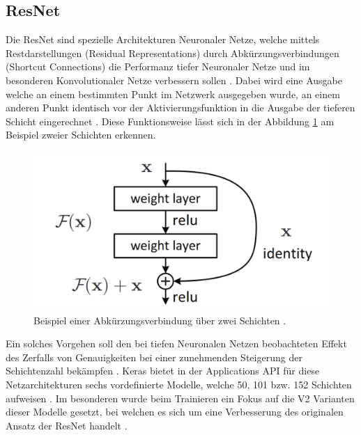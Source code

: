 \documentclass[twoside,a4paper]{IEEEtran}
\begin{document}
\subsection{ResNet} %
Die ResNet sind spezielle Architekturen Neuronaler Netze, welche mittels Restdarstellungen (Residual Representations) durch Abkürzungsverbindungen (Shortcut Connections) die Performanz tiefer Neuronaler Netze und im besonderen Konvolutionaler Netze verbessern sollen \cite[S.1-2]{resnet}. Dabei wird eine Ausgabe welche an einem bestimmten Punkt im Netzwerk ausgegeben wurde, an einem anderen Punkt identisch vor der Aktivierungsfunktion in die Ausgabe der tieferen Schicht eingerechnet \cite[S.4]{resnet}. Diese Funktionsweise lässt sich in der Abbildung \ref{res} am Beispiel zweier Schichten erkennen.
\begin{figure}[!htb]
	\includegraphics[width=\columnwidth]{residual}
	\caption{Beispiel einer Abkürzungsverbindung über zwei Schichten \cite[S.2]{resnet}.}
	\label{res}
\end{figure}


Ein solches Vorgehen soll den bei tiefen Neuronalen Netzen beobachteten Effekt des Zerfalls von Genauigkeiten bei einer zunehmenden Steigerung der Schichtenzahl bekämpfen \cite[S.1]{resnet}. Keras bietet in der Applications API für diese Netzarchitekturen sechs vordefinierte Modelle, welche 50, 101 bzw. 152 Schichten aufweisen \cite{resnet_keras}. Im besonderen wurde beim Trainieren ein Fokus auf die V2 Varianten dieser Modelle gesetzt, bei welchen es sich um eine Verbesserung des originalen Ansatz der ResNet handelt \cite{resnetv2}.
\end{document}
